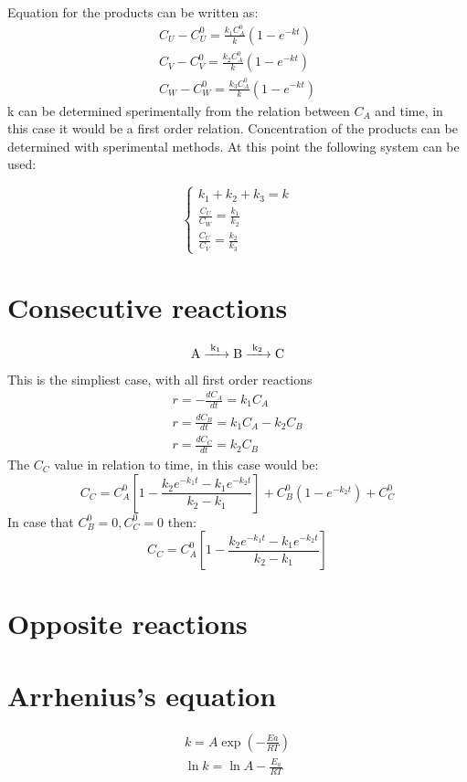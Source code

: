 \documentclass[../Master.tex]{subfiles}
\begin{document}
\begin{multicols*}{2}
		  Equation for the products can be written as:
		  \begin{gather*}
				   C_{U} - C_{U}^{0} = \frac{k_{1}C_{A}^{0}}{k}(1-e^{-kt})\\
				   C_{V} - C_{V}^{0} = \frac{k_{2}C_{A}^{0}}{k}(1-e^{-kt})\\
				   C_{W} - C_{W}^{0} = \frac{k_{3}C_{A}^{0}}{k}(1-e^{-kt})
		  \end{gather*}
		  k can be determined sperimentally from the relation between \( C_{A}  \) and time, in this case it would be a first order relation.
		  Concentration of the products can be determined with sperimental methods. At this point the following system can be used:

		  \begin{equation*}
				   \begin{cases}
						    k_{1} + k_{2} + k_{3} = k                  \\
						    \frac{C_{U}}{C_{W} } = \frac{k_{1}}{k_{2}} \\
						    \frac{C_{U} }{C_{V}} = \frac{k_{2}}{k_{3}}
				   \end{cases}
		  \end{equation*}

		 \section{Consecutive reactions}
		  \begin{gather*}
				   \ce{ A ->[{k_{1}}] B ->[{k_{2}}]C}\\
		  \end{gather*}
		  This is the simpliest case, with all first order reactions
		  \begin{gather*}
				   r = -\frac{dC_{A}}{dt} = k_{1}C_{A}\\
				   r = \frac{dC_{B}}{dt} = k_{1}C_{A} - k_{2}C_{B}\\
				   r = \frac{dC_{C}}{dt} = k_{2}C_{B}
		  \end{gather*}
		  The $C_{C}$ value in relation to time, in this case would be:
		  \[
				   C_{C} = C_{A}^{0}\left[1 -\frac{k_{2}e^{-k_{1}t} -k_{1}e^{-k_{2}t}}{k_{2}-k_{1}} \right] + C_{B}^{0}(1-e^{-k_{2}t})+C_{C}^{0}
		  \]
		  In case that \( C_{B}^0=0, C_{C}^0 = 0 \) then:
		  \[
				   C_{C} = C_{A}^{0}\left[1 -\frac{k_{2}e^{-k_{1}t} -k_{1}e^{-k_{2}t}}{k_{2}-k_{1}} \right]
		  \]
		 \section{Opposite reactions}

		 \section{Arrhenius's equation}
		  \begin{gather*}
				   k = A \exp \left( -\frac{Ea}{RT} \right)\\
				   \ln k = \ln A - \frac{E_{a}}{RT}
		  \end{gather*}
\end{multicols*}
\end{document}
